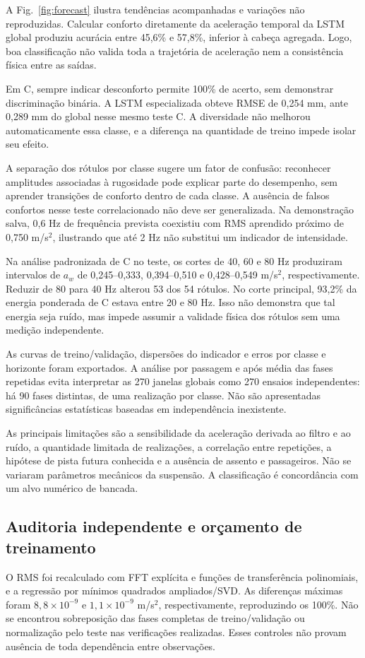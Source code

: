 \documentclass[conference]{IEEEtran}
\begin{document}
A Fig.~\ref{fig:forecast} ilustra tendências acompanhadas e variações não reproduzidas. Calcular conforto diretamente da aceleração temporal da LSTM global produziu acurácia entre 45,6\% e 57,8\%, inferior à cabeça agregada. Logo, boa classificação não valida toda a trajetória de aceleração nem a consistência física entre as saídas.

Em C, sempre indicar desconforto permite 100\% de acerto, sem demonstrar discriminação binária. A LSTM especializada obteve RMSE de 0,254 mm, ante 0,289 mm do global nesse mesmo teste C. A diversidade não melhorou automaticamente essa classe, e a diferença na quantidade de treino impede isolar seu efeito.

A separação dos rótulos por classe sugere um fator de confusão: reconhecer amplitudes associadas à rugosidade pode explicar parte do desempenho, sem aprender transições de conforto dentro de cada classe. A ausência de falsos confortos nesse teste correlacionado não deve ser generalizada. Na demonstração salva, 0,6 Hz de frequência prevista coexistiu com RMS aprendido próximo de 0,750 m/s$^2$, ilustrando que até 2 Hz não substitui um indicador de intensidade.

Na análise padronizada de C no teste, os cortes de 40, 60 e 80 Hz produziram intervalos de $a_w$ de 0,245--0,333, 0,394--0,510 e 0,428--0,549 m/s$^2$, respectivamente. Reduzir de 80 para 40 Hz alterou 53 dos 54 rótulos. No corte principal, 93,2\% da energia ponderada de C estava entre 20 e 80 Hz. Isso não demonstra que tal energia seja ruído, mas impede assumir a validade física dos rótulos sem uma medição independente.

As curvas de treino/validação, dispersões do indicador e erros por classe e horizonte foram exportados. A análise por passagem e após média das fases repetidas evita interpretar as 270 janelas globais como 270 ensaios independentes: há 90 fases distintas, de uma realização por classe. Não são apresentadas significâncias estatísticas baseadas em independência inexistente.

As principais limitações são a sensibilidade da aceleração derivada ao filtro e ao ruído, a quantidade limitada de realizações, a correlação entre repetições, a hipótese de pista futura conhecida e a ausência de assento e passageiros. Não se variaram parâmetros mecânicos da suspensão. A classificação é concordância com um alvo numérico de bancada.

\subsection{Auditoria independente e orçamento de treinamento}
O RMS foi recalculado com FFT explícita e funções de transferência polinomiais, e a regressão por mínimos quadrados ampliados/SVD. As diferenças máximas foram $8{,}8\times10^{-9}$ e $1{,}1\times10^{-9}$ m/s$^2$, respectivamente, reproduzindo os 100\%. Não se encontrou sobreposição das fases completas de treino/validação ou normalização pelo teste nas verificações realizadas. Esses controles não provam ausência de toda dependência entre observações.
\end{document}
